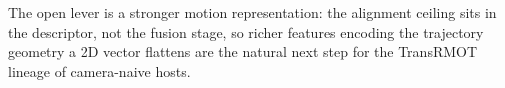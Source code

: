 \documentclass[sigconf,review,anonymous]{acmart}
\begin{document}
The open lever is a stronger motion representation: the alignment ceiling sits in the descriptor, not the fusion stage, so richer features encoding the trajectory geometry a 2D vector flattens are the natural next step for the TransRMOT~\cite{transrmot} lineage of camera-naive hosts.



\end{document}
